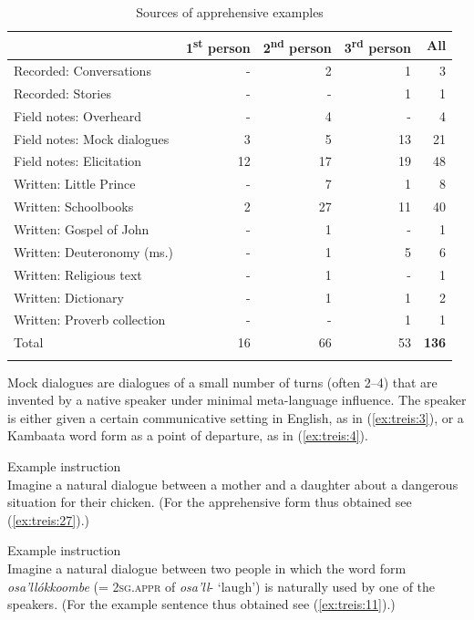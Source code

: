 \documentclass[output=paper,colorlinks,citecolor=brown,
]{langsci/langscibook}
\begin{document}
\begin{table}
\caption{Sources of apprehensive examples}
\label{tab:treis:1}
 \begin{tabular}{lrrrr}
  \lsptoprule
            & 1\textsuperscript{st} person & 2\textsuperscript{nd} person & 3\textsuperscript{rd} person & All\\
  \midrule
Recorded: Conversations & - & 2 & 1 & 3\\
Recorded: Stories & - & - & 1 & 1\\
Field notes: Overheard & - & 4 & - & 4\\
Field notes: Mock dialogues & 3 & 5 & 13 & 21\\
Field notes: Elicitation & 12 & 17 & 19 & 48\\ 
Written: Little Prince & - & 7 & 1 & 8\\
Written: Schoolbooks & 2 & 27 & 11 & 40\\
Written: Gospel of John & - & 1 & - & 1\\
Written: Deuteronomy (ms.) & - & 1 & 5 & 6\\
Written: Religious text & - & 1 & - & 1\\
Written: Dictionary & - & 1 & 1 & 2\\
Written: Proverb collection & - & - & 1 & 1\\
  \midrule
  Total & 16 & 66 & 53 & \textbf{136}\\
  \lspbottomrule
 \end{tabular}
\end{table}


Mock dialogues are dialogues of a small number of turns (often 2--4) that are invented by a native speaker under minimal meta-language influence. The speaker is either given a certain communicative setting in English, as in (\ref{ex:treis:3}), or a Kambaata word form as a point of departure, as in (\ref{ex:treis:4}).

\ea\label{ex:treis:3} \textnormal{Example instruction}\\
\textnormal{Imagine a natural dialogue between a mother and a daughter about a dangerous situation for their chicken. (For the apprehensive form thus obtained see (\ref{ex:treis:27}).)}
\z

\ea\label{ex:treis:4} \textnormal{Example instruction}\\
\textnormal{Imagine a natural dialogue between two people in which the word form \textit{osa'llókkoombe} (= \textsc{2sg.appr} of \textit{osa'll}- `laugh') is naturally used by one of the speakers. (For the example sentence thus obtained see (\ref{ex:treis:11}).)}
\z
\end{document}
